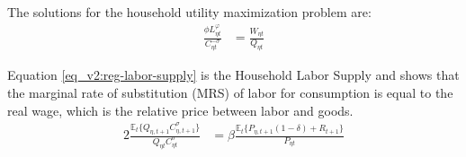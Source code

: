 \documentclass[../thesis.tex]{subfiles}
\begin{document}
\begin{comment}
The first order conditions are:
\begin{align}
	C_{\eta t}: &\quad \beta^t \left\{ \frac{(1 -\sigma) C_{\eta t}^{-\sigma}}{1-\sigma} - \mu_{\eta t} \left[ Q_{\eta t} \right] \right\} = 0 \implies \nonumber \\
	&\quad \mu_{\eta t} = \frac{C_{\eta t}^{-\sigma}}{Q_{\eta t}} \label{eq_v2:reg-FOC-C-eta-t}
	\\
	L_{\eta t}: &\quad \beta^t \left\{ -\phi \frac{(1+\varphi) L_{\eta t}^{1 + \varphi}}{1 + \varphi} - \mu_{\eta t} \left[ -W_{\eta t} \right] \right\} = 0 \implies \nonumber \\
	&\quad \mu_{\eta t} = \frac{\phi L_{\eta t}^{\varphi}}{W_{\eta t}} \label{eq_v2:reg-FOC-Lt}
	\\
	K_{\eta,t+1}: &\quad \beta^t \{-\mu_{\eta t} [P_{\eta t}] \} + \mathbb{E}_{t} \beta^{t+1} \{ -\mu_{\eta,t+1} [-(P_{\eta,t+1} (1 - \delta) + R_{t+1})] \} = 0 \implies \nonumber \\
	&\quad \mu_{\eta t} P_{\eta t} = \beta \mathbb{E}_{t} \{ \mu_{\eta,t+1} [P_{\eta,t+1} (1 - \delta) + R_{t+1}] \} \label{eq_v2:reg-FOC-Kt}
	\\
	\mu_{\eta t}: &\quad Q_{\eta t} C_{\eta t} + P_{\eta t} (K_{\eta,t+1} - (1 - \delta) K_{\eta t}) = W_{\eta t} L_{\eta t} + R_{t} K_{\eta t} + \Pi_{\eta t} \tag{\ref{eq_v2:reg-budget-constraint-2}}
\end{align}

\end{comment}


The solutions for the household utility maximization problem are:
\begin{align}
	\frac{\phi L_{\eta t}^{\varphi}}{C_{\eta t}^{-\sigma}} &= \frac{W_{\eta t}}{Q_{\eta t}} \label{eq_v2:reg-labor-supply}
\end{align}

Equation \ref{eq_v2:reg-labor-supply} is the Household Labor Supply and shows that the marginal rate of substitution (MRS) of labor for consumption is equal to the real wage, which is the relative price between labor and goods.
\begin{alignat}{2}
	\frac{\mathbb{E}_{t} \{ Q_{\eta,t+1} C_{\eta,t+1}^{\sigma} \} }{ Q_{\eta t} C_{\eta t}^{\sigma} } &= \beta \frac{ \mathbb{E}_{t} \{ P_{\eta,t+1} (1 - \delta) + R_{t+1} \} }{P_{\eta t}} \label{eq_v2:reg-capital-euler-equation}
\end{alignat}
\end{document}
